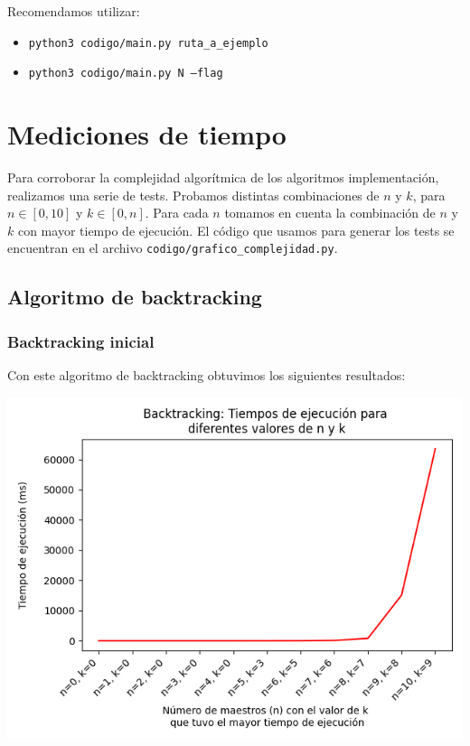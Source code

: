 \documentclass{article}
\begin{document}
Recomendamos utilizar:
\begin{itemize}
    \item \texttt{python3\ codigo/main.py\ ruta\_a\_ejemplo}
    \item \texttt{python3\ codigo/main.py\ N\ --flag}
\end{itemize}


\section{Mediciones de tiempo}
\label{sec:medTiempo}
Para corroborar la complejidad algorítmica de los algoritmos implementación, realizamos una serie de tests. Probamos distintas combinaciones de $n$ y $k$, para $n \in [0, 10]$ y $k \in [0, n]$. Para cada $n$ tomamos en cuenta la combinación de $n$ y $k$ con mayor tiempo de ejecución. El código que usamos para generar los tests se encuentran en el archivo 
\texttt{codigo/grafico\_complejidad.py}.

\subsection{Algoritmo de backtracking}
\subsubsection{Backtracking inicial}

Con este algoritmo de backtracking obtuvimos los siguientes resultados:

\includegraphics[scale=0.60]{images/graficoBacktracking.png}
\end{document}
